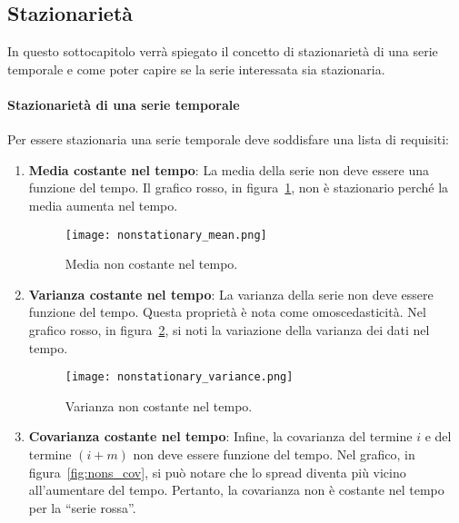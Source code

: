 \subsection{Stazionarietà}
In questo sottocapitolo verrà spiegato il concetto di stazionarietà di una serie
temporale e come poter capire se la serie interessata sia stazionaria.
 
\paragraph{Stazionarietà di una serie temporale} %
Per essere stazionaria una serie temporale deve soddisfare
una lista di requisiti:
\begin{enumerate}
    
    \item \textbf{Media costante nel tempo}: La media della serie non deve essere 
    una funzione del tempo. Il grafico rosso, in figura~\ref*{fig:nons_mean}, non è stazionario 
    perché la media aumenta nel tempo.

    \begin{figure}[H]
        \centering
        \texttt{[image: nonstationary\_mean.png]}
        \caption{Media non costante nel tempo.}
        \label{fig:nons_mean}
    \end{figure}


    \item \textbf{Varianza costante nel tempo}: La varianza della serie non deve 
    essere funzione del tempo. Questa proprietà è nota come omoscedasticità. 
    Nel grafico rosso, in figura~\ref*{fig:nons_var}, si noti la variazione della varianza dei dati nel tempo.

    \begin{figure}[H]
        \centering
        \texttt{[image: nonstationary\_variance.png]}
        \caption{Varianza non costante nel tempo.}
        \label{fig:nons_var}
    \end{figure}

    \item \textbf{Covarianza costante nel tempo}: Infine, la covarianza del 
    termine $i$ e del termine $(i + m)$ non deve essere funzione del tempo. 
    Nel grafico, in figura~\ref*{fig:nons_cov}, si può notare che lo spread 
    diventa più vicino all'aumentare del tempo. Pertanto, 
    la covarianza non è costante nel tempo per la ``serie rossa''.


\end{enumerate}
